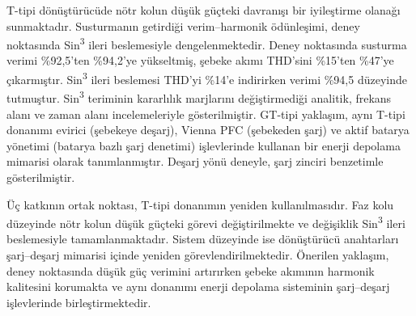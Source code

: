 T-tipi dönüştürücüde nötr kolun düşük güçteki davranışı bir iyileştirme olanağı sunmaktadır. Susturmanın getirdiği verim--harmonik ödünleşimi, deney noktasında Sin\textsuperscript{3} ileri beslemesiyle dengelenmektedir. Deney noktasında susturma verimi \%92,5'ten \%94,2'ye yükseltmiş, şebeke akımı THD'sini \%15'ten \%47'ye çıkarmıştır. Sin\textsuperscript{3} ileri beslemesi THD'yi \%14'e indirirken verimi \%94,5 düzeyinde tutmuştur. Sin\textsuperscript{3} teriminin kararlılık marjlarını değiştirmediği analitik, frekans alanı ve zaman alanı incelemeleriyle gösterilmiştir. GT-tipi yaklaşım, aynı T-tipi donanımı evirici (şebekeye deşarj), Vienna PFC (şebekeden şarj) ve aktif batarya yönetimi (batarya bazlı şarj denetimi) işlevlerinde kullanan bir enerji depolama mimarisi olarak tanımlanmıştır. Deşarj yönü deneyle, şarj zinciri benzetimle gösterilmiştir.

Üç katkının ortak noktası, T-tipi donanımın yeniden kullanılmasıdır. Faz kolu düzeyinde nötr kolun düşük güçteki görevi değiştirilmekte ve değişiklik Sin\textsuperscript{3} ileri beslemesiyle tamamlanmaktadır. Sistem düzeyinde ise dönüştürücü anahtarları şarj--deşarj mimarisi içinde yeniden görevlendirilmektedir. Önerilen yaklaşım, deney noktasında düşük güç verimini artırırken şebeke akımının harmonik kalitesini korumakta ve aynı donanımı enerji depolama sisteminin şarj--deşarj işlevlerinde birleştirmektedir.
